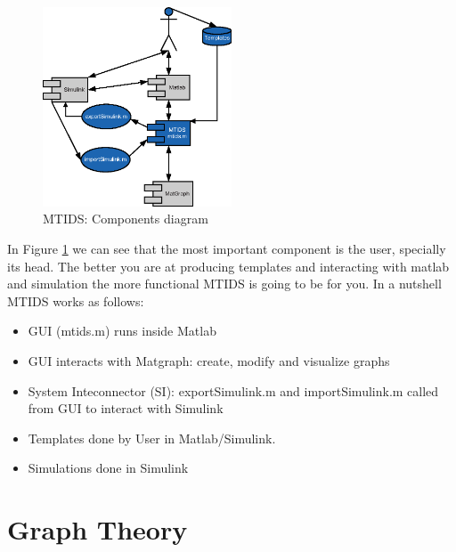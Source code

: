 \documentclass[a4paper,twoside, openright,12pt]{report}
\begin{document}
 

\begin{figure}[htb]
\centering
\includegraphics[width=0.5\textwidth]{pics/uml.eps}
\caption[MTIDS components]{MTIDS: Components diagram}
\label{componentsFig}
\end{figure}

In Figure \ref{componentsFig} we can see that the most important component is the user, specially its head. The better you are at producing templates
and interacting with matlab and simulation the more functional MTIDS is going to be for you.
In a nutshell MTIDS works as follows:
\begin{itemize}
\item GUI (mtids.m) runs inside Matlab
\item GUI interacts with Matgraph: create, modify and visualize graphs  
\item System Inteconnector (SI): exportSimulink.m and importSimulink.m called from GUI to interact with Simulink
\item Templates done by User in Matlab/Simulink.
\item Simulations done in Simulink
\end{itemize}
%  
% 

\chapter{Graph Theory}\label{chapter2}
\end{document}
